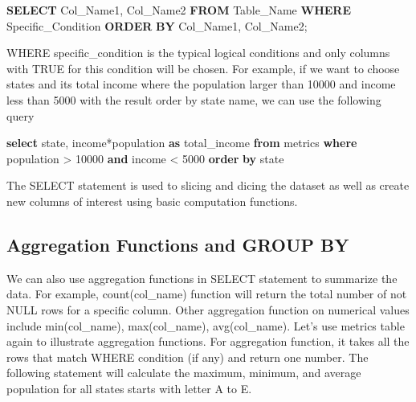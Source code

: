 \documentclass[]{book}
\newenvironment{Shaded}{\begin{snugshade}}{\end{snugshade}}
\newcommand{\KeywordTok}[1]{\textcolor[rgb]{0.13,0.29,0.53}{\textbf{{#1}}}}
\newcommand{\DecValTok}[1]{\textcolor[rgb]{0.00,0.00,0.81}{{#1}}}
\newcommand{\NormalTok}[1]{{#1}}
\theoremstyle{definition}
\theoremstyle{definition}
\theoremstyle{remark}
\begin{document}
\begin{Shaded}
\begin{Highlighting}[]
\KeywordTok{SELECT} \NormalTok{Col_Name1, Col_Name2}
\KeywordTok{FROM} \NormalTok{Table_Name}
\KeywordTok{WHERE} \NormalTok{Specific_Condition}
\KeywordTok{ORDER} \KeywordTok{BY} \NormalTok{Col_Name1, Col_Name2;}
\end{Highlighting}
\end{Shaded}

WHERE specific\_condition is the typical logical conditions and only
columns with TRUE for this condition will be chosen. For example, if we
want to choose states and its total income where the population larger
than 10000 and income less than 5000 with the result order by state
name, we can use the following query

\begin{Shaded}
\begin{Highlighting}[]
\KeywordTok{select} \NormalTok{state, income*population }\KeywordTok{as} \NormalTok{total_income  }
\KeywordTok{from} \NormalTok{metrics}
\KeywordTok{where} \NormalTok{population > }\DecValTok{10000} \KeywordTok{and} \NormalTok{income < }\DecValTok{5000}
\KeywordTok{order} \KeywordTok{by} \NormalTok{state}
\end{Highlighting}
\end{Shaded}

The SELECT statement is used to slicing and dicing the dataset as well
as create new columns of interest using basic computation functions.

\subsection{Aggregation Functions and GROUP
BY}\label{aggregation-functions-and-group-by}

We can also use aggregation functions in SELECT statement to summarize
the data. For example, count(col\_name) function will return the total
number of not NULL rows for a specific column. Other aggregation
function on numerical values include min(col\_name), max(col\_name),
avg(col\_name). Let's use metrics table again to illustrate aggregation
functions. For aggregation function, it takes all the rows that match
WHERE condition (if any) and return one number. The following statement
will calculate the maximum, minimum, and average population for all
states starts with letter A to E.
\end{document}
